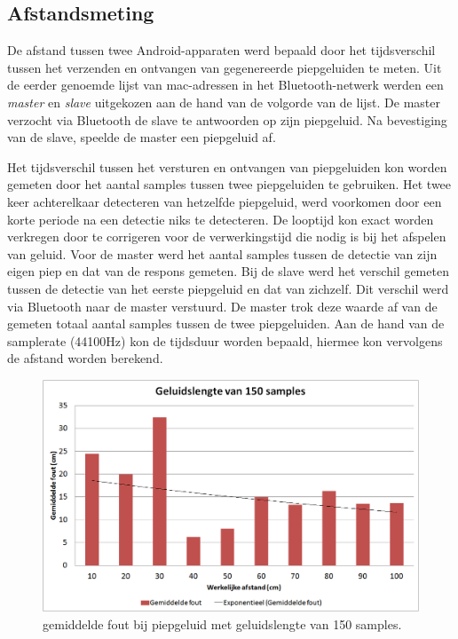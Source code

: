\documentclass[12pt]{article}
\begin{document}
\subsection{Afstandsmeting}
De afstand tussen twee Android-apparaten werd bepaald door het tijdsverschil tussen het verzenden en ontvangen van gegenereerde piepgeluiden te meten. Uit de eerder genoemde lijst van mac-adressen in het Bluetooth-netwerk werden een \textit{master} en \textit{slave} uitgekozen aan de hand van de volgorde van de lijst. De master verzocht via Bluetooth de slave te antwoorden op zijn piepgeluid. Na bevestiging van de slave, speelde de master een piepgeluid af.

Het tijdsverschil tussen het versturen en ontvangen van piepgeluiden kon worden gemeten door het aantal samples tussen twee piepgeluiden te gebruiken. Het twee keer achterelkaar detecteren van hetzelfde piepgeluid, werd voorkomen door een korte periode na een detectie niks te detecteren. De looptijd kon exact worden verkregen door te corrigeren voor de verwerkingstijd die nodig is bij het afspelen van geluid. Voor de master werd het aantal samples tussen de detectie van zijn eigen piep en dat van de respons gemeten. Bij de slave werd het verschil gemeten tussen de detectie van het eerste piepgeluid en dat van zichzelf. Dit verschil werd via Bluetooth naar de master verstuurd. De master trok deze waarde af van de gemeten totaal aantal samples tussen de twee piepgeluiden. Aan de hand van de samplerate (44100Hz) kon de tijdsduur worden bepaald, hiermee kon vervolgens de afstand worden berekend.

\begin{figure}[t]
\centering
\includegraphics[scale=0.4]{150-samples}
\caption{gemiddelde fout bij piepgeluid met geluidslengte van 150 samples.}
\label{fig:150}
\end{figure}
\end{document}
